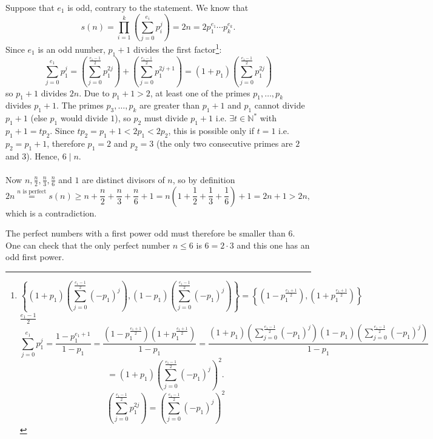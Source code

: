 \begin{solution}
    Suppose that \( e_{1} \) is odd, contrary to the statement. We know that
    \[
        s\left(n\right) = \prod_{i=1}^{k} \left(\sum_{j=0}^{e_i}p_{i}^{j}\right) = 2n = 2p_{1}^{e_{1}} \cdots p_{k}^{e_{k}}.
    \]
    Since \( e_{1} \) is an odd number, \( p_{1} + 1 \) divides the first factor\footnote{
    \[
        \left\{\left(1+p_{1}\right)\left(\sum_{j=0}^{\frac{e_{1}-1}{2}}\left(-p_{1}\right)^j\right),\left(1-p_{1}\right)\left(\sum_{j=0}^{\frac{e_{1}-1}{2}}\left(-p_{1}\right)^j\right)\right\}=\left\{\left(1-p_{1}^{\frac{e_1+1}{2}}\right),\left(1+p_{1}^{\frac{e_1+1}{2}}\right)\right\}
    \]
     \( \frac{e_1-1}{2} \)
    \[
        \sum_{j=0}^{e_1}p_{1}^{j}=\frac{1-p_{1}^{e_1+1}}{1-p_{1}}=\frac{\left(1-p_{1}^{\frac{e_1+1}{2}}\right)\left(1+p_{1}^{\frac{e_1+1}{2}}\right)}{1-p_{1}} =\frac{\left(1+p_{1}\right)\left(\sum_{j=0}^{\frac{e_{1}-1}{2}}\left(-p_{1}\right)^j\right)\left(1-p_{1}\right)\left(\sum_{j=0}^{\frac{e_{1}-1}{2}}\left(-p_{1}\right)^j\right)}{1-p_{1}}
    \]
    \[
        =\left(1+p_{1}\right)\left(\sum_{j=0}^{\frac{e_{1}-1}{2}}\left(-p_{1}\right)^j\right)^2.
    \]
    \[
        \left(\sum_{j=0}^{\frac{e_1-1}{2}}p_1^{2j}\right)=\left(\sum_{j=0}^{\frac{e_{1}-1}{2}}\left(-p_{1}\right)^j\right)^2
    \]
    }:
    \[
        \sum_{j=0}^{e_1}p_{1}^{j}=\left(\sum_{j=0}^{\frac{e_1-1}{2}}p_1^{2j}\right)+\left(\sum_{j=0}^{\frac{e_1-1}{2}}p_1^{2j+1}\right)=\left(1+p_1\right)\left(\sum_{j=0}^{\frac{e_1-1}{2}}p_1^{2j}\right)
    \]
    so \( p_{1} + 1 \) divides \( 2n \). Due to \( p_{1} + 1 > 2 \), at least one of the primes \( p_{1}, \ldots, p_{k} \) divides \( p_{1} + 1 \). The primes \( p_{3}, \ldots, p_{k} \) are greater than \( p_{1} + 1 \) and \( p_{1} \) cannot divide \( p_{1} + 1 \) (else \( p_{1} \) would divide \( 1 \)), so \( p_{2} \) must divide \( p_{1} + 1 \) i.e. \( \exists t\in\mathbb{N}^{*} \) with \( p_{1}+1=tp_{2} \). Since \( tp_{2}=p_{1} + 1 < 2p_{1}<2p_{2} \), this is possible only if \( t=1 \) i.e. \( p_{2} = p_{1} + 1 \), therefore \( p_{1} = 2 \) and \( p_{2} = 3 \) (the only two consecutive primes are \( 2 \) and \( 3 \)). Hence, \( 6 \mid n \).
    \\\\
    Now \( n, \frac{n}{2}, \frac{n}{3}, \frac{n}{6} \) and \( 1 \) are distinct divisors of \( n \), so by definition
    \[
        2n\overset{n\text{ is perfect}}{=}s\left(n\right) \geq n + \frac{n}{2} + \frac{n}{3} + \frac{n}{6} + 1 = n\left(1+\frac{1}{2} + \frac{1}{3} + \frac{1}{6}\right)+1= 2n + 1 > 2n,
    \]
    which is a contradiction.
    \begin{remark}
        The perfect numbers with a first power odd must therefore be smaller than \( 6 \). One can check that the only perfect number \( n\leq 6 \) is \( 6=2\cdot 3 \) and this one has an odd first power.
    \end{remark}
\end{solution}

